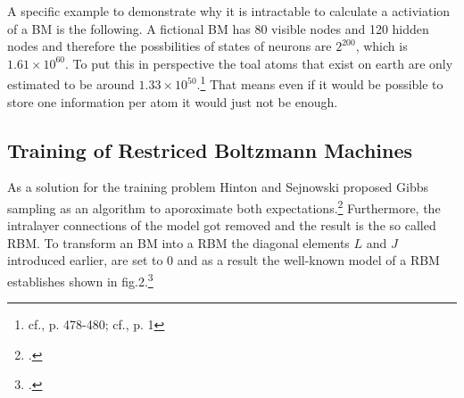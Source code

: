 A specific example to demonstrate why it is intractable to calculate a activiation of a \ac{BM} is the following. A fictional \ac{BM} has 80 visible nodes and 120 hidden nodes and therefore the possbilities of states of neurons are \( 2^{200} \), which is \( 1.61 \times 10^{60}\). 
To put this in perspective the toal atoms that exist on earth are only estimated to be around \( 1.33 \times 10^{50}\).\footnote{cf.\cite{helmenstineHowManyAtoms2022}, p. 478-480; cf.\cite{schlammingerCoolWayMeasure2014}, p. 1}
That means even if it would be possible to store one information per atom it would just not be enough. 

\subsection{Training of Restriced Boltzmann Machines}

As a solution for the training problem Hinton and Sejnowski proposed Gibbs sampling as an algorithm to aporoximate both expectations.\footcite[cf.][158-165]{ackleyLearningAlgorithmBoltzmann1985}
Furthermore, the intralayer connections of the model got removed and the result is the so called \ac{RBM}.
To transform an \ac{BM} into a \ac{RBM} the diagonal elements \( L \) and \( J \)  introduced earlier, are set to 0 and as a result the well-known model of a \ac{RBM} establishes shown in fig.2.\footcite[cf.][449]{salakhutdinovDeepBoltzmannMachines2009}

